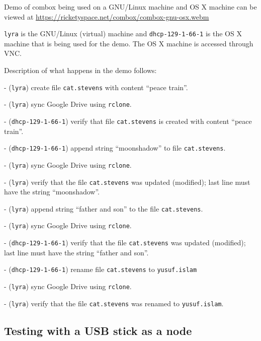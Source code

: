 Demo of combox being used on a GNU/Linux machine and OS X machine can
be viewed at \url{https://ricketyspace.net/combox/combox-gnu-osx.webm}

\verb+lyra+ is the GNU/Linux (virtual) machine and
\verb+dhcp-129-1-66-1+ is the OS X machine that is being used for the
demo. The OS X machine is accessed through VNC\cite{article:vnc}.

Description of what happens in the demo follows:

  - (\verb+lyra+) create file \verb+cat.stevens+ with content ``peace train''.

  - (\verb+lyra+) sync Google Drive using \verb+rclone+.

  - (\verb+dhcp-129-1-66-1+) verify that file \verb+cat.stevens+ is
  created with content ``peace train''.

  - (\verb+dhcp-129-1-66-1+) append string ``moonshadow'' to file
  \verb+cat.stevens+.

  - (\verb+lyra+) sync Google Drive using \verb+rclone+.

  - (\verb+lyra+) verify that the file \verb+cat.stevens+ was updated
  (modified); last line must have the string ``moonshadow''.

  - (\verb+lyra+) append string ``father and son'' to the file
  \verb+cat.stevens+.

  - (\verb+lyra+) sync Google Drive using \verb+rclone+.

  - (\verb+dhcp-129-1-66-1+) verify that the file \verb+cat.stevens+
  was updated (modified); last line must have the string ``father and
  son''.

  - (\verb+dhcp-129-1-66-1+) rename file \verb+cat.stevens+ to
  \verb+yusuf.islam+

  - (\verb+lyra+) sync Google Drive using \verb+rclone+.

  - (\verb+lyra+) verify that the file \verb+cat.stevens+ was renamed
  to \verb+yusuf.islam+.

\subsection{Testing with a USB stick as a node}

